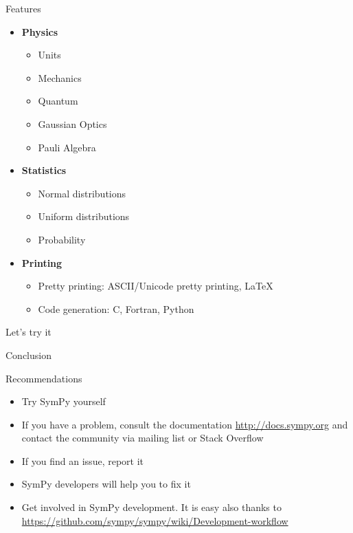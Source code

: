 \documentclass[aspectratio=169,xcolor=svgnames]{beamer}
\begin{document}
\begin{frame}{Features}
\begin{multicols}{2}
\begin{itemize}
    \item \textbf{Physics}
      \begin{itemize}
        \tiny
      \item Units
      \item Mechanics
      \item Quantum
      \item Gaussian Optics
      \item Pauli Algebra
      \end{itemize}

    \item \textbf{Statistics}
      \begin{itemize}
        \tiny
      \item Normal distributions
      \item Uniform distributions
      \item Probability
      \end{itemize}

    \item \textbf{Printing}
      \begin{itemize}
        \tiny
      \item Pretty printing: ASCII/Unicode pretty printing, LaTeX
      \item Code generation: C, Fortran, Python
      \end{itemize}
    \end{itemize}
  \end{multicols}
\end{frame}


\begin{frame}
\Large Let's try it
\end{frame}

\begin{frame}{Conclusion}
\begin{block}{Recommendations}
\begin{itemize}
\item Try SymPy yourself
\item If you have a problem, consult the documentation \url{http://docs.sympy.org} and contact the community via mailing list or Stack Overflow 
\item If you find an issue, report it
\item SymPy developers will help you to fix it
\item Get involved in SymPy development. It is easy also thanks to
    \url{https://github.com/sympy/sympy/wiki/Development-workflow}
\end{itemize}
\end{block}
\end{frame}





\end{document}
